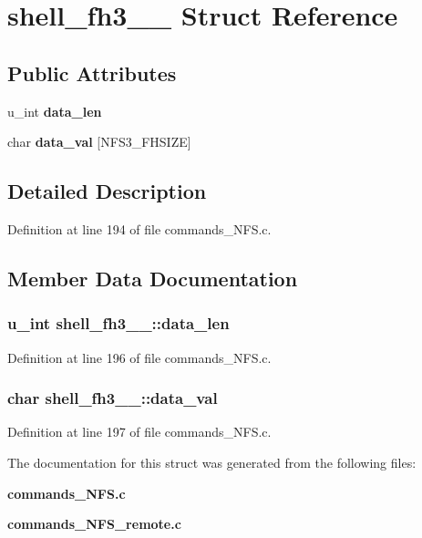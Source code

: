 \section{shell\_\-fh3\_\-\_\- Struct Reference}
\label{structshell__fh3____}
\subsection*{Public Attributes}
\begin{DoxyCompactItemize}
\item 
u\_\-int {\bf data\_\-len}
\item 
char {\bf data\_\-val} [NFS3\_\-FHSIZE]
\end{DoxyCompactItemize}


\subsection{Detailed Description}


Definition at line 194 of file commands\_\-NFS.c.

\subsection{Member Data Documentation}
\subsubsection[{data\_\-len}]{\setlength{\rightskip}{0pt plus 5cm}u\_\-int {\bf shell\_\-fh3\_\-\_\-::data\_\-len}}\label{structshell__fh3_____ac6f85b37736c75dd12c1c37d1df0cfe5}


Definition at line 196 of file commands\_\-NFS.c.
\subsubsection[{data\_\-val}]{\setlength{\rightskip}{0pt plus 5cm}char {\bf shell\_\-fh3\_\-\_\-::data\_\-val}}\label{structshell__fh3_____a3d763c4c25800302c7d0db07a186e3de}


Definition at line 197 of file commands\_\-NFS.c.

The documentation for this struct was generated from the following files:\begin{DoxyCompactItemize}
\item 
{\bf commands\_\-NFS.c}\item 
{\bf commands\_\-NFS\_\-remote.c}\end{DoxyCompactItemize}
